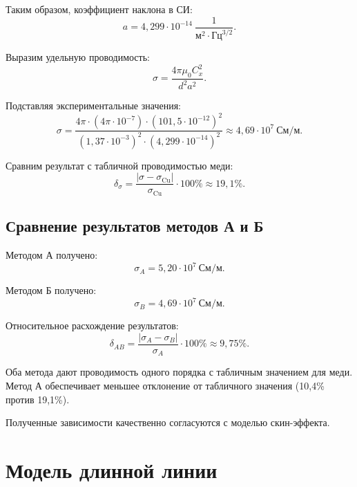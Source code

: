 \documentclass[a4paper,14pt]{extarticle}
\begin{document}
Таким образом, коэффициент наклона в СИ:
\begin{equation}
    a = 4{,}299\cdot10^{-14}
    \ \frac{1}{\text{м}^2\cdot\text{Гц}^{3/2}}.
\end{equation}

Выразим удельную проводимость:
\begin{equation}
    \sigma=\frac{4\pi\mu_0 C_x^2}{d^2a^2}.
\end{equation}

Подставляя экспериментальные значения:
\begin{equation}
    \sigma =
    \frac{
        4\pi\cdot(4\pi\cdot10^{-7})
        \cdot(101{,}5\cdot10^{-12})^2
    }{
        (1{,}37\cdot10^{-3})^2
        \cdot(4{,}299\cdot10^{-14})^2
    }
    \approx 4{,}69\cdot10^7\ \text{См/м}.
\end{equation}

Сравним результат с табличной проводимостью меди:
\begin{equation}
    \delta_\sigma =
    \frac{|\sigma-\sigma_{\mathrm{Cu}}|}
    {\sigma_{\mathrm{Cu}}}\cdot100\%
    \approx 19{,}1\%.
\end{equation}

\subsection{Сравнение результатов методов А и Б}

Методом А получено:
\[
    \sigma_A=5{,}20\cdot10^7\ \text{См/м}.
\]

Методом Б получено:
\[
    \sigma_B=4{,}69\cdot10^7\ \text{См/м}.
\]

Относительное расхождение результатов:
\begin{equation}
    \delta_{AB}=
    \frac{|\sigma_A-\sigma_B|}{\sigma_A}
    \cdot100\%\approx9{,}75\%.
\end{equation}

Оба метода дают проводимость одного порядка
с табличным значением для меди.
Метод А обеспечивает меньшее отклонение
от табличного значения (10,4\% против 19,1\%).

Полученные зависимости качественно
согласуются с моделью скин-эффекта.

\newpage

\section{Модель длинной линии}
\end{document}
